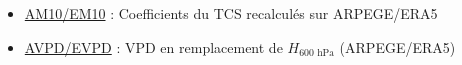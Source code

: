 \documentclass[aspectratio=169, usepdftitle=false, xcolor={dvipsnames}, 9pt,table]{beamer}
\begin{document}
\begin{frame}[t]
\begin{columns}
\begin{column}{0.3\textwidth}
\begin{examples}[Indices]
\begin{itemize}
                    \item \underline{AM10/EM10} : Coefficients du TCS recalculés sur ARPEGE/ERA5
                    \item \underline{AVPD/EVPD} : VPD en remplacement de $H_\text{600~hPa}$ (ARPEGE/ERA5) 
                \end{itemize}
            \end{examples}
            \vspace{1em}
        \end{column}
    \end{columns}
\end{frame}

\end{document}
